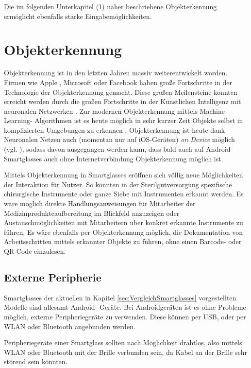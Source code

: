 Die im folgenden Unterkapitel (\ref{sec:Objekterkennung}) näher beschriebene Objekterkennung ermöglicht ebenfalls starke Eingabemöglichkeiten.
%
%
\section{Objekterkennung}
\label{sec:Objekterkennung}
Objekterkennung ist in den letzten Jahren massiv weiterentwickelt worden. Firmen wie Apple \cite{Apple2018b}, Microsoft \cite{Girshick2015} oder Facebook \cite{Schroepfer2015} haben große Fortschritte in der Technologie der Objekterkennung gemacht. Diese großen Meilensteine konnten erreicht werden durch die großen Fortschritte in der Künstlichen Intelligenz mit neuronalen Netzwerken \cite{Apple2018b, Schroepfer2015}. Zur modernen Objekterkennung mittels Machine Learning- Algorithmen ist es heute möglich in sehr kurzer Zeit Objekte selbst in komplizierten Umgebungen zu erkennen \cite{Schroepfer2015}. 
Objekterkennung ist heute dank Neuronalen Netzen auch (momentan nur auf iOS-Geräten) \emph{on Device} möglich (vgl. \cite{Apple2018b}), sodass davon ausgegangen werden kann, dass bald auch auf Android- Smartglasses auch ohne Internetverbindung Objekterkennung möglich ist.

Mittels Objekterkennung in Smartglasses eröffnen sich völlig neue Möglichkeiten der Interaktion für Nutzer. So könnten in der Sterilgutversorgung spezifische chirurgische Instrumente oder ganze Siebe mit Instrumenten erkannt werden. Es wäre möglich direkte Handlungsanweisungen für Mitarbeiter der Medizinprodukteaufbereitung im Blickfeld anzuzeigen oder Austauschmöglichkeiten mit Mitarbeitern über konkret erkannte Instrumente zu führen. Es wäre ebenfalls per Objekterkennung möglich, die Dokumentation von Arbeitsschritten mittels erkannter Objekte zu führen, ohne einen Barcode- oder QR-Code einzulesen.
%
%
\subsection{Externe Peripherie}
\label{sec:Externe_Peripherie}
Smartglasses der aktuellen in Kapitel \ref{sec:VergleichSmartglasses} vorgestellten Modelle sind allesamt Android- Geräte. Bei Androidgeräten ist es ohne Probleme möglich, externe Peripheriegeräte zu verwenden. Diese können per USB, oder per WLAN oder Bluetooth angebunden werden. 

Peripheriegeräte einer Smartglass sollten nach Möglichkeit drahtlos, also mittels WLAN oder Bluetooth mit der Brille verbunden sein, da Kabel an der Brille sehr störend sein könnten. 


